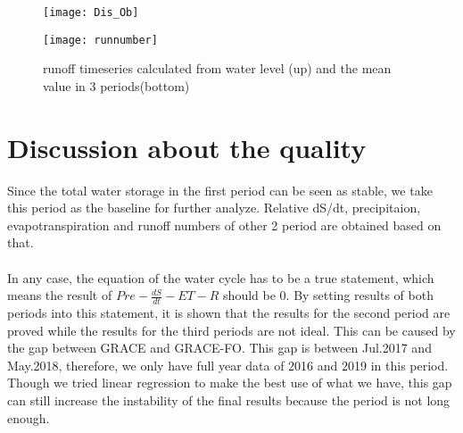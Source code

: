 \begin{figure}[htbp]
	\centering
	\begin{minipage}[t]{0.9\textwidth}
		\centering
		\texttt{[image: Dis\_Ob]} %
	\end{minipage}
	\begin{minipage}[t]{0.9\textwidth}
		\centering
		\texttt{[image: runnumber]} %
	\end{minipage}
	\caption{runoff timeseries calculated from water level (up) and the mean value in 3 periods(bottom) }
	\label{fig:runoff}
\end{figure}
\clearpage
\section{Discussion about the quality}
Since the total water storage in the first period can be seen as stable, we take this period as the baseline for further analyze. Relative dS/dt, precipitaion, evapotranspiration and runoff numbers of other 2 period are obtained based on that. \\\\
In any case, the equation of the water cycle has to be a true statement, which means the result of $Pre-\frac{dS}{dt}-ET-R$ should be 0. By setting results of both periods into this statement, it is shown that the results for the second period are proved while the results for the third periods are not ideal. This can be caused by the gap between GRACE and GRACE-FO. This gap is between Jul.2017 and May.2018, therefore, we only have full year data of 2016 and 2019 in this period. Though we tried linear regression to make the best use of what we have, this gap can still increase the instability of the final results because the period is not long enough. 

